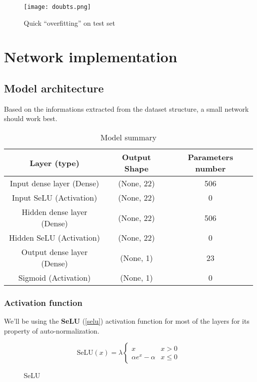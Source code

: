 \begin{figure}
	\texttt{[image: doubts.png]}
	\caption{Quick ``overfitting'' on test set}
\end{figure}

\part{Network implementation}
\chapter{Model architecture}
Based on the informations extracted from the dataset structure, a small network should work best.

\begin{table}
	\begin{tabular}{|c|c|c|}
		\hline
		\textbf{Layer (type)}      & \textbf{Output Shape} & \textbf{Parameters number} \\
		\hline
		Input dense layer (Dense)  & (None, 22)            & 506                        \\
		\hline
		Input SeLU (Activation)    & (None, 22)            & 0                          \\
		\hline
		Hidden dense layer (Dense) & (None, 22)            & 506                        \\
		\hline
		Hidden SeLU (Activation)   & (None, 22)            & 0                          \\
		\hline
		Output dense layer (Dense) & (None, 1)             & 23                         \\
		\hline
		Sigmoid (Activation)       & (None, 1)             & 0                          \\
		\hline
	\end{tabular}
	\caption{Model summary}
\end{table}

\section{Activation function}
We'll be using the \textbf{SeLU} (\ref{selu}) activation function for most of the layers for its property of auto-normalization.

\begin{figure}
	\[
		\text{SeLU}(x) = \lambda \begin{cases}
			x                 & x > 0    \\
			\alpha e^x-\alpha & x \leq 0
		\end{cases}
	\]
	\caption{SeLU}
\end{figure}

